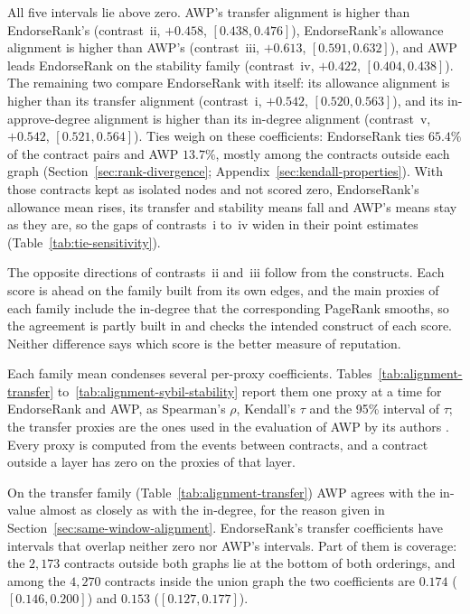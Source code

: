 All five intervals lie above zero. AWP's transfer alignment is higher than EndorseRank's (contrast~ii, $+0.458$, $[0.438,0.476]$), EndorseRank's allowance alignment is higher than AWP's (contrast~iii, $+0.613$, $[0.591,0.632]$), and AWP leads EndorseRank on the stability family (contrast~iv, $+0.422$, $[0.404,0.438]$). The remaining two compare EndorseRank with itself: its allowance alignment is higher than its transfer alignment (contrast~i, $+0.542$, $[0.520,0.563]$), and its in-approve-degree alignment is higher than its in-degree alignment (contrast~v, $+0.542$, $[0.521,0.564]$). Ties weigh on these coefficients: EndorseRank ties $65.4\%$ of the contract pairs and AWP $13.7\%$, mostly among the contracts outside each graph (Section~\ref{sec:rank-divergence}; Appendix~\ref{sec:kendall-properties}). With those contracts kept as isolated nodes and not scored zero, EndorseRank's allowance mean rises, its transfer and stability means fall and AWP's means stay as they are, so the gaps of contrasts~i to~iv widen in their point estimates (Table~\ref{tab:tie-sensitivity}).

The opposite directions of contrasts~ii and~iii follow from the constructs. Each score is ahead on the family built from its own edges, and the main proxies of each family include the in-degree that the corresponding PageRank smooths, so the agreement is partly built in and checks the intended construct of each score. Neither difference says which score is the better measure of reputation.


Each family mean condenses several per-proxy coefficients. Tables~\ref{tab:alignment-transfer} to~\ref{tab:alignment-sybil-stability} report them one proxy at a time for EndorseRank and AWP, as Spearman's $\rho$, Kendall's $\tau$ and the 95\% interval of $\tau$; the transfer proxies are the ones used in the evaluation of AWP by its authors \parencite{do2023awp}. Every proxy is computed from the events between contracts, and a contract outside a layer has zero on the proxies of that layer.



On the transfer family (Table~\ref{tab:alignment-transfer})\label{sub:transfer-family} AWP agrees with the in-value almost as closely as with the in-degree, for the reason given in Section~\ref{sec:same-window-alignment}. EndorseRank's transfer coefficients have intervals that overlap neither zero nor AWP's intervals. Part of them is coverage: the $2{,}173$ contracts outside both graphs lie at the bottom of both orderings, and among the $4{,}270$ contracts inside the union graph the two coefficients are $0.174$ ($[0.146,0.200]$) and $0.153$ ($[0.127,0.177]$).

